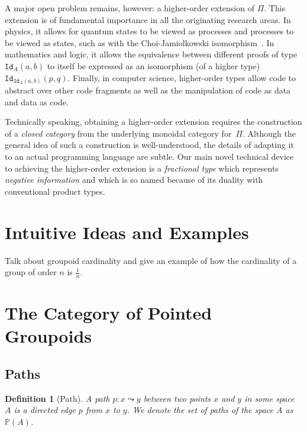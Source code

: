 \documentclass[11pt]{article}
\newtheorem{definition}{Definition}
\renewcommand{\path}{\leadsto}
\newcommand{\paths}[1]{\mathds{P}(#1)}
\begin{document}
A major open problem remains, however: a higher-order extension of
$\Pi$. This extension is of fundamental importance in all the originating
research areas. In physics, it allows for quantum states to be viewed as
processes and processes to be viewed as states, such as with the
Choi-Jamiolkowski
isomorphism~\cite{choi1975completely,jamiolkowski1972linear}.  In mathematics
and logic, it allows the equivalence between different proofs of type
$\texttt{Id}_A(a,b)$ to itself be expressed as an isomorphism (of a higher
type) $\texttt{Id}_{\texttt{Id}_A(a,b)}(p,q)$. Finally, in computer science,
higher-order types allow code to abstract over other code fragments as well
as the manipulation of code as data and data as code.

Technically speaking, obtaining a higher-order extension requires the
construction of a \emph{closed category} from the underlying monoidal
category for~$\Pi$. Although the general idea of such a construction is
well-understood, the details of adapting it to an actual programming language
are subtle.  Our main novel technical device to achieving the higher-order
extension is a \emph{fractional type} which represents \emph{negative
information} and which is so named because of its duality with conventional
product types.

\section{Intuitive Ideas and Examples} 
\label{sec:intuition}

Talk about groupoid cardinality and give an example of how the cardinality of
a group of order $n$ is $\frac{1}{n}$.

\section{The Category of Pointed Groupoids}

\subsection{Paths} 

\begin{definition}[Path]
A \emph{path} $p : x \path y$ between two points $x$ and $y$ in some space
$A$ is a directed edge $p$ from $x$ to $y$. We denote the set of paths of the
space $A$ as $\paths{A}$.
\end{definition}
\end{document}
